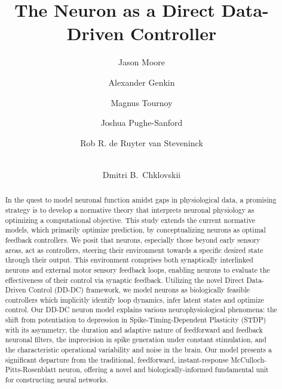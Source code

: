\documentclass[9pt,twocolumn,twoside]{pnas-new}
\begin{document}
\title{The Neuron as a Direct Data-Driven Controller}

\author[a]{Jason Moore}
\author[b]{Alexander Genkin} 
\author[b]{Magnus Tournoy}
\author[b]{Joshua Pughe-Sanford}
\author[c]{Rob R. de Ruyter van Steveninck}
\author[a,b,1]{\\Dmitri B.\ Chklovskii}

\equalauthors{}


\begin{abstract}
 In the quest to model neuronal function amidst gaps in physiological data, a promising strategy is to develop a normative theory that interprets neuronal physiology as optimizing a computational objective. This study extends the current normative models, which primarily optimize prediction, by conceptualizing neurons as optimal feedback controllers. We posit that neurons, especially those beyond early sensory areas, act as controllers, steering their environment towards a specific desired state through their output. This environment comprises both synaptically interlinked neurons and external motor sensory feedback loops, enabling neurons to evaluate the effectiveness of their control via synaptic feedback. Utilizing the novel Direct Data-Driven Control (DD-DC) framework, we model neurons as biologically feasible controllers which implicitly identify loop dynamics, infer latent states and optimize control. Our DD-DC neuron model explains various neurophysiological phenomena: the shift from potentiation to depression in Spike-Timing-Dependent Plasticity (STDP) with its asymmetry, the duration and adaptive nature of feedforward and feedback neuronal filters, the imprecision in spike generation under constant stimulation, and the characteristic operational variability and noise in the brain. Our model presents a significant departure from the traditional, feedforward, instant-response McCulloch-Pitts-Rosenblatt neuron, offering a novel and biologically-informed fundamental unit for constructing neural networks.
\end{abstract}
\end{document}
